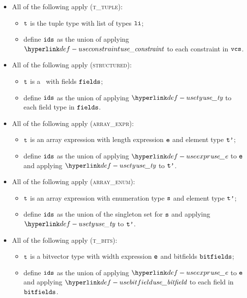 \begin{itemize}
  \item All of the following apply (\textsc{t\_tuple}):
  \begin{itemize}
    \item $\texttt{t}$ is the tuple type with list of types $\texttt{li}$;
    \item define $\texttt{ids}$ as the union of applying $\useconstraint$ to each constraint in $\texttt{vcs}$.
  \end{itemize}

  \item All of the following apply (\textsc{structured}):
  \begin{itemize}
    \item $\texttt{t}$ is a \structuredtype\ with fields $\texttt{fields}$;
    \item define $\texttt{ids}$ as the union of applying $\usety$ to each field type in $\texttt{fields}$.
  \end{itemize}

  \item All of the following apply (\textsc{array\_expr}):
  \begin{itemize}
    \item $\texttt{t}$ is an array expression with length expression $\texttt{e}$ and element type $\texttt{t'}$;
    \item define $\texttt{ids}$ as the union of applying $\useexpr$ to $\texttt{e}$ and applying $\usety$ to $\texttt{t'}$.
  \end{itemize}

  \item All of the following apply (\textsc{array\_enum}):
  \begin{itemize}
    \item $\texttt{t}$ is an array expression with enumeration type $\texttt{s}$ and element type $\texttt{t'}$;
    \item define $\texttt{ids}$ as the union of the singleton set for $\texttt{s}$ and applying $\usety$ to $\texttt{t'}$.
  \end{itemize}

  \item All of the following apply (\textsc{t\_bits}):
  \begin{itemize}
    \item $\texttt{t}$ is a bitvector type with width expression $\texttt{e}$ and bitfields $\texttt{bitfields}$;
    \item define $\texttt{ids}$ as the union of applying $\useexpr$ to $\texttt{e}$ and applying $\usebitfield$ to each field in $\texttt{bitfields}$.
  \end{itemize}
\end{itemize}

